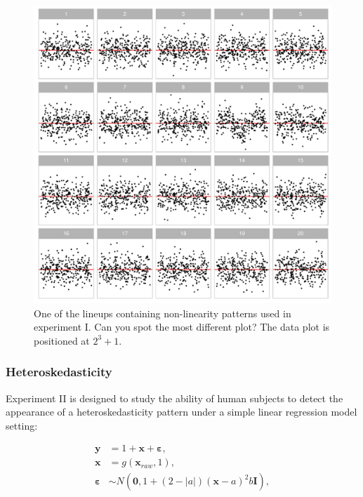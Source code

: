 \documentclass[]{interact}
\theoremstyle{plain}%
\theoremstyle{definition}
\theoremstyle{remark}
\begin{document}
\begin{figure}

{\centering \includegraphics[width=1\linewidth]{paper_comparison_files/figure-latex/example-poly-lineup-1} 

}

\caption{One of the lineups containing non-linearity patterns used in experiment I. Can you spot the most different plot? The data plot is positioned at $2^3 + 1$.}\label{fig:example-poly-lineup}
\end{figure}

\hypertarget{heteroskedasticity}{%
\subsubsection{Heteroskedasticity}\label{heteroskedasticity}}

Experiment II is designed to study the ability of human subjects to
detect the appearance of a heteroskedasticity pattern under a simple
linear regression model setting:

\begin{align} \label{eq:heter-model}
\boldsymbol{y} &= 1 + \boldsymbol{x} + \boldsymbol{\varepsilon},\\
\boldsymbol{x} &= g(\boldsymbol{x}_{raw}, 1),\\
\boldsymbol{\varepsilon} &\sim N(\boldsymbol{0}, 1 + (2 - |a|)(\boldsymbol{x} - a)^2b \boldsymbol{I}), 
\end{align}
\end{document}
